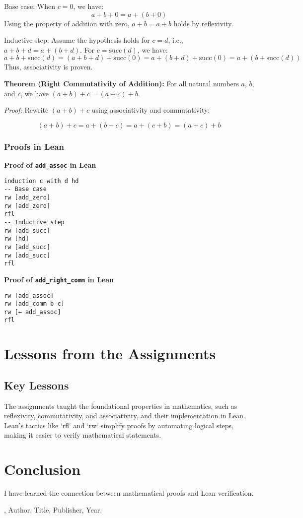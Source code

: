 \documentclass{article}
\theoremstyle{theorem}
\theoremstyle{definition}
\theoremstyle{remark}
\begin{document}
Base case: When $c = 0$, we have:
\[
a + b + 0 = a + (b + 0)
\]
Using the property of addition with zero, $a + b = a + b$ holds by reflexivity.

Inductive step: Assume the hypothesis holds for $c = d$, i.e., $a + b + d = a + (b + d)$. For $c = \text{succ}(d)$, we have:
\[
a + b + \text{succ}(d) = (a + b + d) + \text{succ}(0) = a + (b + d) + \text{succ}(0) = a + (b + \text{succ}(d))
\]
Thus, associativity is proven.

\textbf{Theorem (Right Commutativity of Addition):} For all natural numbers $a$, $b$, and $c$, we have $(a + b) + c = (a + c) + b$.

\textit{Proof:} Rewrite $(a + b) + c$ using associativity and commutativity:

\[
(a + b) + c = a + (b + c) = a + (c + b) = (a + c) + b
\]

\subsubsection*{Proofs in Lean}

\textbf{Proof of \texttt{add\_assoc} in Lean}
\begin{verbatim}
induction c with d hd
-- Base case
rw [add_zero]
rw [add_zero]
rfl
-- Inductive step
rw [add_succ]
rw [hd]
rw [add_succ]
rw [add_succ]
rfl
\end{verbatim}

\textbf{Proof of \texttt{add\_right\_comm} in Lean}
\begin{verbatim}
rw [add_assoc]
rw [add_comm b c]
rw [← add_assoc]
rfl
\end{verbatim}

\section{Lessons from the Assignments}

\subsection{Key Lessons}

The assignments taught the foundational properties in mathematics, such as reflexivity, commutativity, and associativity, and their implementation in Lean. Lean's tactics like `rfl` and `rw` simplify proofs by automating logical steps, making it easier to verify mathematical statements. 

\section{Conclusion}\label{conclusion}

I have learned the connection between mathematical proofs and Lean verification. 

\begin{thebibliography}{99}
\bibitem [BLA], Author, Title, Publisher, Year.
\end{thebibliography}
\end{document}
